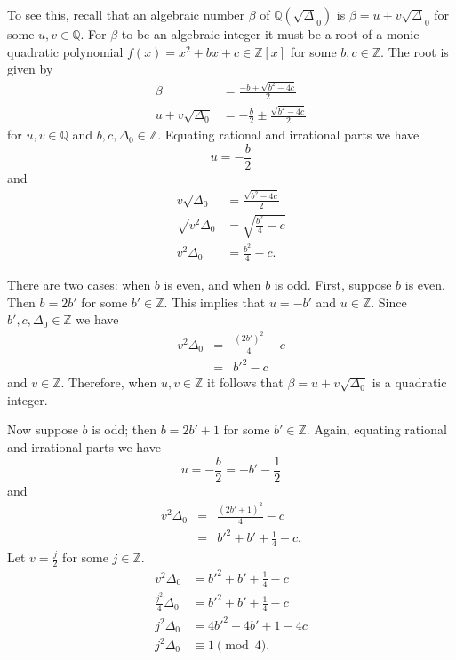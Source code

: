 \documentclass{ucalgthes1}
\theoremstyle{plain}
\theoremstyle{definition}
\newcommand{\ZZ}{\mathbb{Z}}
\newcommand{\QQ}{\mathbb{Q}}
\begin{document}
\noindent
To see this, recall that an algebraic number $\beta$ of $\QQ(\sqrt\Delta_0)$ is $\beta = u+v\sqrt\Delta_0$ for some $u,v \in \QQ$.  For $\beta$ to be an  algebraic integer it must be a root of a monic quadratic polynomial $f(x) = x^2+bx+c \in \ZZ[x]$ for some $b,c \in \ZZ$.  The root is given by
\begin{align*}
	\beta &= \frac{-b \pm \sqrt{b^2-4c}}{2} \\
	u + v \sqrt{\Delta_0} &= -\frac{b}{2} \pm \frac{\sqrt{b^2-4c}}{2}
\end{align*}
for $u,v \in \QQ$ and $b,c,\Delta_0 \in \ZZ$.
Equating rational and irrational parts we have
\begin{equation*}
	u = -\frac{b}{2}
\end{equation*}
and
\begin{align*}
	v \sqrt{\Delta_0} &= \frac{\sqrt{b^2 -4c}}{2} \\
	\sqrt{v^2 \Delta_0} &= \sqrt{\frac{b^2}{4} - c} \\
	v^2 \Delta_0 &= \frac{b^2}{4} - c.
\end{align*}


There are two cases: when $b$ is even, and when $b$ is odd.  First, suppose $b$ is even.  Then $b=2b'$ for some $b' \in \ZZ$.  This implies that $u = -b'$ and $u \in \ZZ$.  Since $b', c, \Delta_0 \in \ZZ$ we have
\begin{eqnarray*}
	v^2 \Delta_0 & = & \frac{(2b')^2}{4} - c \\
	& = & b'^2 - c
\end{eqnarray*}
and $v \in \ZZ$.  Therefore, when $u, v \in \ZZ$ it follows that $\beta = u + v \sqrt{\Delta_0}$ is a quadratic integer.

\bigbreak
Now suppose $b$ is odd; then $b=2b' + 1$ for some $b' \in \ZZ$.  Again, equating rational and irrational parts we have
\[
	u = - \frac{b}{2} = -b' - \frac{1}{2}
\]
and
\begin{eqnarray*}
	v^2 \Delta_0 & = & \frac{(2b'+1)^2}{4} - c \\
	& = & b'^2 + b' + \frac{1}{4} -c.
\end{eqnarray*}
Let $v = \frac{j}{2}$ for some $j \in \ZZ$.  
\begin{align*}
	v^2 \Delta_0 & = b'^2 + b' + \frac{1}{4} -c \\
	\frac{j^2}{4} \Delta_0 & = b'^2 + b' + \frac{1}{4} -c \\
	j^2 \Delta_0 & = 4b'^2 + 4b' + 1 - 4c \\
	j^2 \Delta_0 & \equiv 1 \pmod 4.
\end{align*}
\end{document}
